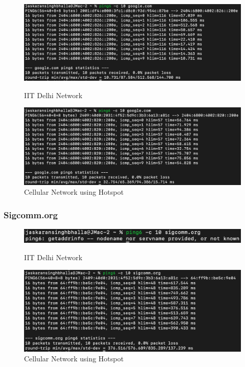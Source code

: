 \documentclass{article}
\begin{document}
\begin{figure}[H]
    \centering
    \begin{minipage}{0.5\textwidth}
        \centering
        \includegraphics[width=\linewidth]{part-1/ping-ipv6-google-iitd.png}
        \caption{IIT Delhi Network}
    \end{minipage}
    \hfill
    \begin{minipage}{0.45\textwidth}
        \centering
        \includegraphics[width=\linewidth]{part-1/ping-ipv6-google-cellular.png}
        \caption{Cellular Network using Hotspot}
    \end{minipage}
\end{figure}

\subsubsection*{Sigcomm.org}

\begin{figure}[H]
    \centering
    \begin{minipage}{0.45\textwidth}
        \centering
        \includegraphics[width=\linewidth]{part-1/ping-ipv6-sigcomm-iitd.png}
        \caption{IIT Delhi Network}
    \end{minipage}
    \hfill
    \begin{minipage}{0.45\textwidth}
        \centering
        \includegraphics[width=\linewidth]{part-1/ping-ipv6-sigcomm-cellular.png}
        \caption{Cellular Network using Hotspot}
    \end{minipage}
\end{figure}
\end{document}
